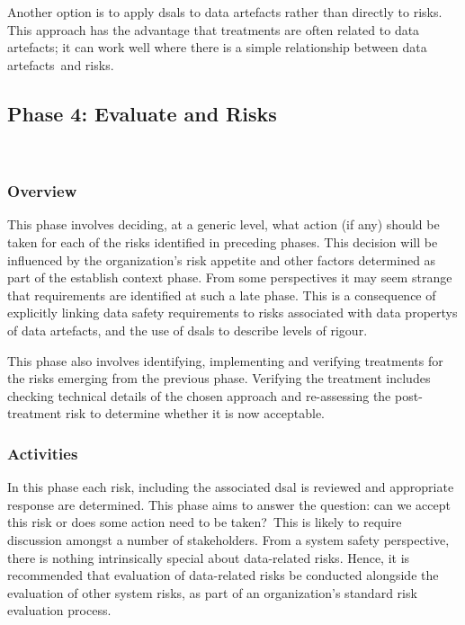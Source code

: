 Another option is to apply \glspl{dsal} to \glspl{data artefact} rather than directly to risks. This approach has the advantage that \glspl{treatment} are often related to \cbstart\glspl{data artefact}\cbend; it can work well where there is a simple relationship between \cbstart\glspl{data artefact}\cbend\ and risks.

\cbstart\subsection{Phase 4: Evaluate and  Risks}\cbend\
\subsubsection{Overview}
This phase involves deciding, at a generic level, what action (if any) should be taken for each of the risks identified in preceding phases. This decision will be influenced by the organization's risk appetite and other factors determined as part of the establish context phase. From some perspectives it may seem strange that requirements are identified at such a late phase. This is a consequence of explicitly linking data safety requirements to risks associated with \glspl{data property} of \glspl{data artefact}, and the use of \glspl{dsal} to describe levels of rigour. 

This phase also involves identifying, implementing and verifying \glspl{treatment} for the risks emerging from the previous phase. \cbstart Verifying the \gls{treatment} includes checking technical details of the chosen approach and re-assessing the post-\gls{treatment} risk to determine whether it is now acceptable\cbend.

\subsubsection{Activities}
\cbstart In this phase each risk, including the associated \gls{dsal} is reviewed and appropriate \gls{response} are determined. This phase aims to answer the question: can we accept this risk or does some action need to be taken?\cbend\ This is likely to require discussion amongst a number of \glspl{stakeholder}. From a system safety perspective, there is nothing intrinsically special about data-related risks. Hence, it is recommended that evaluation of data-related risks be conducted alongside the evaluation of other system risks, as part of an organization's standard risk evaluation process.

